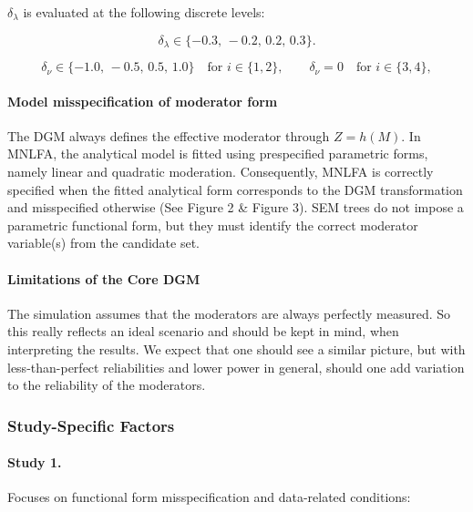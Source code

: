 \documentclass[
  man,
  floatsintext]{apa7}
\begin{document}
\(\delta_{\lambda}\) is evaluated at the following discrete levels:

\[
\delta_{\lambda} \in \{-0.3,\,-0.2,\,0.2,\,0.3\}.
\]

\[
\delta_{\nu} \in \{-1.0,\,-0.5,\,0.5,\,1.0\} \quad \text{for } i \in \{1,2\},
    \qquad
    \delta_{\nu} = 0 \quad \text{for } i \in \{3,4\},
\]

\paragraph{Model misspecification of moderator
form}\label{model-misspecification-of-moderator-form}

The DGM always defines the effective moderator through \(Z=h(M)\). In
MNLFA, the analytical model is fitted using prespecified parametric
forms, namely linear and quadratic moderation. Consequently, MNLFA is
correctly specified when the fitted analytical form corresponds to the
DGM transformation and misspecified otherwise (See Figure 2 \& Figure
3). SEM trees do not impose a parametric functional form, but they must
identify the correct moderator variable(s) from the candidate set.

\paragraph{Limitations of the Core
DGM}\label{limitations-of-the-core-dgm}

The simulation assumes that the moderators are always perfectly
measured. So this really reflects an ideal scenario and should be kept
in mind, when interpreting the results. We expect that one should see a
similar picture, but with less-than-perfect reliabilities and lower
power in general, should one add variation to the reliability of the
moderators.

\subsubsection{Study-Specific Factors}\label{study-specific-factors}

\paragraph{Study 1.}\label{study-1.}

Focuses on functional form misspecification and data-related conditions:
\end{document}
